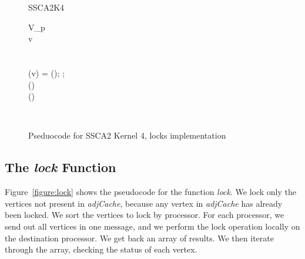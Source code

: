 \documentclass[10pt]{article}
\begin{document}
\begin{sloppypar}
\begin{center}
\begin{figure}
\begin{algorithm}{SSCA2K4}{}
\\
\begin{FOR}{}
\begin{WHILE}{V_p \neq \emptyset}
 \leftarrow \emptyset \\
v \leftarrow {} \\
 \\
 \\
 (v) = 
(); ;  \\
 \leftarrow {}() \\
() \\
\end{WHILE}
\end{FOR} \\
\end{algorithm}
\caption{Pseduocode for SSCA2 Kernel 4, locks implementation}
\label{figure:main}
\end{figure}
\end{center}

\subsection{The \emph{lock} Function}
\label{section:lock}

Figure~\ref{figure:lock} shows the pseudocode for the function
\emph{lock}.  We lock only the vertices not present in
\emph{adjCache}, because any vertex in \emph{adjCache} has already
been locked.  We sort the vertices to lock by processor.  For each
processor, we send out all vertices in one message, and we perform the
lock operation locally on the destination processor.  We get back an
array of results.  We then iterate through the array, checking the
status of each vertex.


\end{sloppypar}
\end{document}
